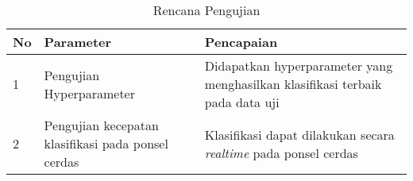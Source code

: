 \begin{table}[ht]
    \centering
    \caption{Rencana Pengujian}
    \begin{tabular}{ |p{0.5cm}|p{5cm}|p{7.5cm}| }
        \hline
        \textbf{No} & \textbf{Parameter} & \textbf{Pencapaian} \\

        \hline
        1 & Pengujian Hyperparameter & Didapatkan hyperparameter yang menghasilkan klasifikasi terbaik pada data uji \\
        
        \hline
        2 & Pengujian kecepatan klasifikasi pada ponsel cerdas & Klasifikasi dapat dilakukan secara \textit{realtime} pada ponsel cerdas \\

        \hline
    \end{tabular}
    \label{table:rencana-pengujian}
\end{table}
